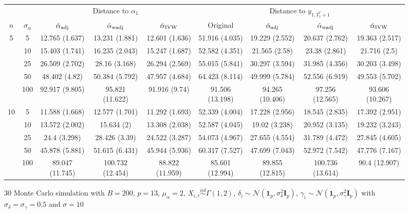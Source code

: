 \documentclass[10pt]{article}
\newcommand{\simiid}{\stackrel{iid}{\sim}} %
\def\normal#1#2{\mathcal{N}(#1,#2)} %
\theoremstyle{definition}
\begin{document}
\begin{sidewaysfigure}
\centering
\caption{30 Monte Carlo simulation  with $B = 200$, $p = 13$, $\mu_{\alpha}=2$, $X_{i,t} \simiid \Gamma(1,2)$, $\delta_i \sim \normal{\mathbf{1}_p}{\sigma^2_{\delta}\mathbf{I}_p}$, $\gamma_i \sim \normal{\mathbf{1}_p}{\sigma^2_{\gamma}\mathbf{I}_p}$ with $\sigma_{\delta}=\sigma_{\gamma}=0.5$ and $\sigma = 10$}
\begin{tabular}{cc|ccc|cccc}
  & & \multicolumn{3}{c|}{Distance to $\alpha_1$}  & \multicolumn{4}{c}{Distance to $y_{1, T_1^*+1}$}  \\ 
  $n$   & $\sigma_{\alpha}$ & $\hat{\alpha}_{\rm adj}$  & $\hat{\alpha}_{\rm wadj}$ & $\hat{\alpha}_{\rm IVW}$ & Original & $\hat{\alpha}_{\rm adj}$ & $\hat{\alpha}_{\rm wadj}$ & $\hat{\alpha}_{\rm IVW}$\\[.3cm]  
  \hline
  \multirow{5}{*}{5} & 5  & 12.765 (1.637) & 13.231 (1.881) & 12.601 (1.636) & 51.916 (4.035) & 19.229 (2.552) & 20.637 (2.762) & 19.363 (2.517) \\ 
  & 10  & 15.403 (1.741) & 16.235 (2.043) & 15.247 (1.687) & 52.582 (4.351) & 21.565 (2.58) & 23.38 (2.861) & 21.716 (2.5) \\ 
  & 25  & 26.509 (2.702) & 28.16 (3.168) & 26.294 (2.569) & 55.015 (5.841) & 30.297 (3.594) & 31.985 (4.356) & 30.203 (3.498) \\ 
  & 50  & 48.402 (4.82) & 50.384 (5.792) & 47.957 (4.684) & 64.423 (8.114) & 49.999 (5.784) & 52.556 (6.919) & 49.553 (5.702) \\ 
  & 100  & 92.917 (9.805) & 95.821 (11.622) & 91.916 (9.74) & 91.506 (13.198) & 94.265 (10.406) & 97.256 (12.565) & 93.606 (10.267) \\[.3cm]  
  \multirow{5}{*}{10} & 5  & 11.588 (1.668) & 12.577 (1.701) & 11.292 (1.693) & 52.339 (4.004) & 17.228 (2.956) & 18.545 (2.835) & 17.392 (2.951) \\ 
  & 10 & 13.572 (2.002) & 15.634 (2) & 13.308 (2.038) & 52.587 (4.045) & 19.02 (3.238) & 20.952 (3.135) & 19.232 (3.243) \\ 
  & 25 & 24.4 (3.298) & 28.426 (3.39) & 24.522 (3.287) & 54.073 (4.967) & 27.655 (4.554) & 31.789 (4.472) & 27.845 (4.605) \\ 
  & 50 & 45.878 (5.881) & 51.615 (6.431) & 45.944 (5.936) & 60.317 (7.527) & 47.699 (7.043) & 52.972 (7.542) & 47.776 (7.167) \\ 
  & 100 & 89.047 (11.745) & 100.732 (12.454) & 88.822 (11.959) & 85.601 (12.994) & 89.855 (12.815) & 100.736 (13.614) & 90.4 (12.907) \\[.3cm]  

\end{tabular}
\end{sidewaysfigure}
\end{document}
